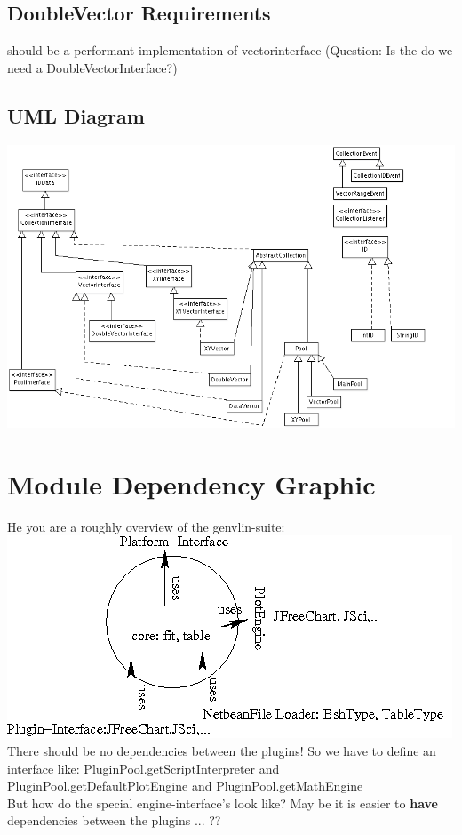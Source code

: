 \documentclass[12pt]{article}
\begin{document}
\subsection{DoubleVector Requirements}
should be a performant implementation of vectorinterface (Question: Is the do we need a DoubleVectorInterface?)
\subsection{UML Diagram}
\includegraphics[width=\textwidth]{uml.png}\\%
\section{Module Dependency Graphic}
He you are a roughly overview of the genvlin-suite:\\[1cm]
\includegraphics[width=\textwidth]{dependencies.png}\\%
There should be no dependencies between the plugins! So we have to define an interface like:
PluginPool.getScriptInterpreter and PluginPool.getDefaultPlotEngine and PluginPool.getMathEngine\\
But how do the special engine-interface's look like? May be it is easier to {\bf have} dependencies between the plugins ... ??
\end{document}
